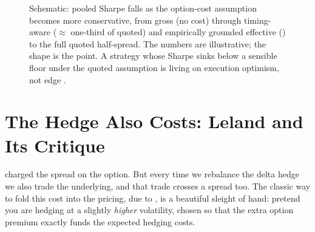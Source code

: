 \begin{figure}[ht]
\centering
{}
\caption{Schematic: pooled Sharpe falls as the option-cost assumption becomes more conservative, from gross (no cost) through timing-aware ($\approx$ one-third of quoted) and empirically grounded effective () to the full quoted half-spread. The numbers are illustrative; the shape is the point. A strategy whose Sharpe sinks below a sensible floor under the quoted assumption is living on execution optimism, not edge \citep{MuravyevPearson2020}.}
\label{fig:ivrv:cost-band}
\end{figure}

\section{The Hedge Also Costs: Leland and Its Critique}
\label{sec:ivrv:leland}

 charged the spread on the option. But every time we rebalance the delta hedge we also trade the underlying, and that trade crosses a spread too. The classic way to fold this cost into the pricing, due to \citet{Leland1985}, is a beautiful sleight of hand: pretend you are hedging at a slightly \emph{higher} volatility, chosen so that the extra option premium exactly funds the expected hedging costs.

